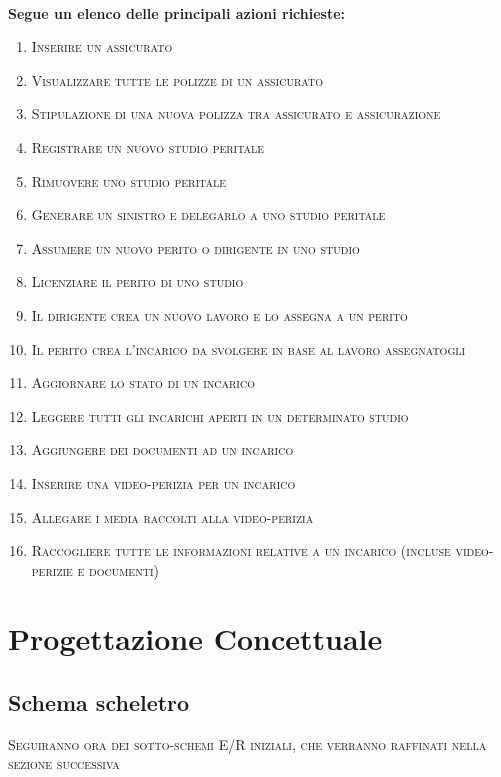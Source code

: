 \documentclass[a4paper,12pt]{report}
\begin{document}
\\
\textbf{Segue un elenco delle principali azioni richieste:}
\begin{enumerate}
    \item \textsc{Inserire un assicurato}
    \item \textsc{Visualizzare tutte le polizze di un assicurato}
    \item \textsc{Stipulazione di una nuova polizza tra assicurato e assicurazione}
    \item \textsc{Registrare un nuovo studio peritale}
    \item \textsc{Rimuovere uno studio peritale}
    \item \textsc{Generare un sinistro e delegarlo a uno studio peritale}
    \item \textsc{Assumere un nuovo perito o dirigente in uno studio}
    \item \textsc{Licenziare il perito di uno studio}
    \item \textsc{Il dirigente crea un nuovo lavoro e lo assegna a un perito}
    \item \textsc{Il perito crea l'incarico da svolgere in base al lavoro assegnatogli}
    \item \textsc{Aggiornare lo stato di un incarico}
    \item \textsc{Leggere tutti gli incarichi aperti in un determinato studio}
    \item \textsc{Aggiungere dei documenti ad un incarico}
    \item \textsc{Inserire una video-perizia per un incarico}
    \item \textsc{Allegare i media raccolti alla video-perizia}
    \item \textsc{Raccogliere tutte le informazioni relative a un incarico (incluse video-perizie e documenti)}
\end{enumerate}


\chapter{Progettazione Concettuale}

\section{Schema scheletro}

\textsc{Seguiranno ora dei sotto-schemi E/R iniziali, che verranno raffinati nella sezione successiva}
\end{document}
